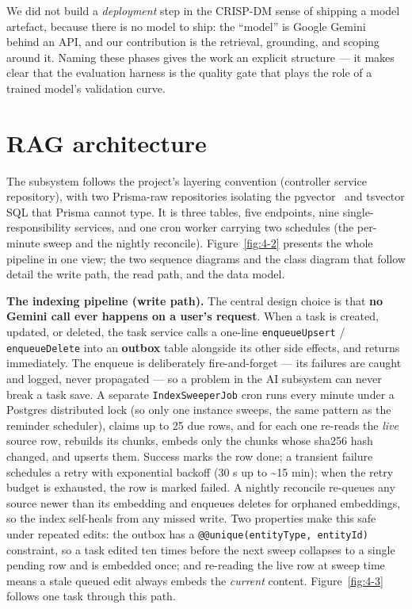 We did not build a \emph{deployment} step in the CRISP-DM sense of shipping a model artefact, because there is no
model to ship: the ``model'' is Google Gemini~\cite{gemini} behind an API, and our contribution is the retrieval,
grounding, and scoping around it. Naming these phases gives the work an explicit structure --- it makes clear
that the evaluation harness is the quality gate that plays the role of a trained model's validation curve.

\section{RAG architecture}

The subsystem follows the project's layering convention (controller \textrightarrow{} service \textrightarrow{} repository), with two
Prisma-raw repositories isolating the pgvector~\cite{pgvector} and tsvector SQL that Prisma cannot type. It is three
tables, five endpoints, nine single-responsibility services, and one cron worker carrying two schedules (the
per-minute sweep and the nightly reconcile). Figure~\ref{fig:4-2} presents the
whole pipeline in one view; the two sequence diagrams and the class diagram that follow detail the write path,
the read path, and the data model.


\textbf{The indexing pipeline (write path).} The central design choice is that \textbf{no Gemini call ever happens on a
user's request}. When a task is created, updated, or deleted, the task service calls a one-line
\texttt{enqueueUpsert} / \texttt{enqueueDelete} into an \textbf{outbox} table alongside its other side effects, and returns
immediately. The enqueue is deliberately fire-and-forget --- its failures are caught and logged, never
propagated --- so a problem in the AI subsystem can never break a task save. A separate
\texttt{IndexSweeperJob} cron runs every minute under a Postgres distributed lock (so only one instance sweeps, the
same pattern as the reminder scheduler), claims up to 25 due rows, and for each one re-reads the \emph{live} source
row, rebuilds its chunks, embeds only the chunks whose sha256 hash changed, and upserts them. Success marks
the row done; a transient failure schedules a retry with exponential backoff (30 s up to \textasciitilde15 min); when
the retry budget is exhausted, the row is marked failed. A nightly reconcile re-queues any source newer than its embedding and
enqueues deletes for orphaned embeddings, so the index self-heals from any missed write.
Two properties make this safe under repeated edits: the outbox has a \texttt{@@unique(entityType, entityId)}
constraint, so a task edited ten times before the next sweep collapses to a single pending row and is embedded
once; and re-reading the live row at sweep time means a stale queued edit always embeds the \emph{current} content.
Figure~\ref{fig:4-3} follows one task through this path.

